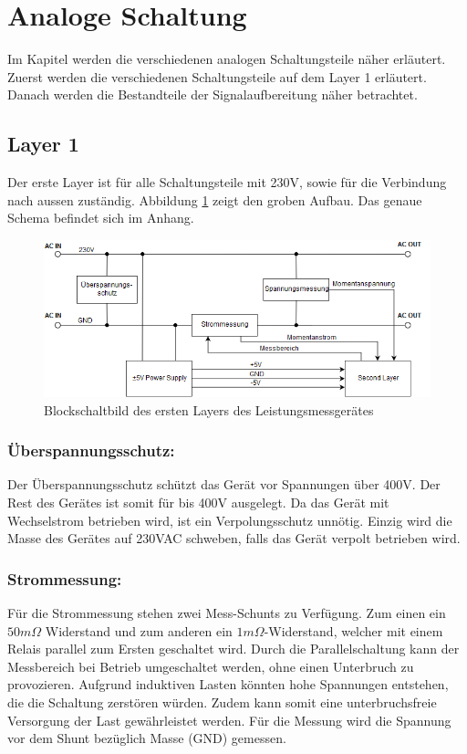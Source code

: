 \section{Analoge Schaltung} 
\label{sec:analoge_schaltung}
Im Kapitel werden die verschiedenen analogen Schaltungsteile näher erläutert. Zuerst werden die verschiedenen Schaltungsteile auf dem Layer 1 erläutert. Danach werden die Bestandteile der Signalaufbereitung näher betrachtet.

\subsection{Layer 1}%
Der erste Layer ist für alle Schaltungsteile mit 230V, sowie für die Verbindung nach aussen zuständig. Abbildung \ref{fig:first_layer} zeigt den groben Aufbau. Das genaue Schema befindet sich im Anhang.

\begin{figure}[H]
\begin{center}
	\includegraphics[width=160mm]{images/first_layer.png}
	\caption{Blockschaltbild des ersten Layers des Leistungsmessgerätes} %
	\label{fig:first_layer}
\end{center}
\end{figure}

\subsubsection*{Überspannungsschutz:}
Der Überspannungsschutz schützt das Gerät vor Spannungen über 400V. Der Rest des Gerätes ist somit für bis 400V ausgelegt. Da das Gerät mit Wechselstrom betrieben wird, ist ein Verpolungsschutz unnötig. Einzig wird die Masse des Gerätes auf 230VAC schweben, falls das Gerät verpolt betrieben wird.

\subsubsection*{Strommessung:}
Für die Strommessung stehen zwei Mess-Schunts zu Verfügung. Zum einen ein $50m\Omega$ Widerstand und zum anderen ein $1m\Omega$-Widerstand, welcher mit einem Relais parallel zum Ersten geschaltet wird. Durch die Parallelschaltung kann der Messbereich bei Betrieb umgeschaltet werden, ohne einen Unterbruch zu provozieren. Aufgrund induktiven Lasten könnten hohe Spannungen entstehen, die die Schaltung zerstören würden. Zudem kann somit eine unterbruchsfreie Versorgung der Last gewährleistet werden. Für die Messung wird die Spannung vor dem Shunt bezüglich Masse (GND) gemessen.

